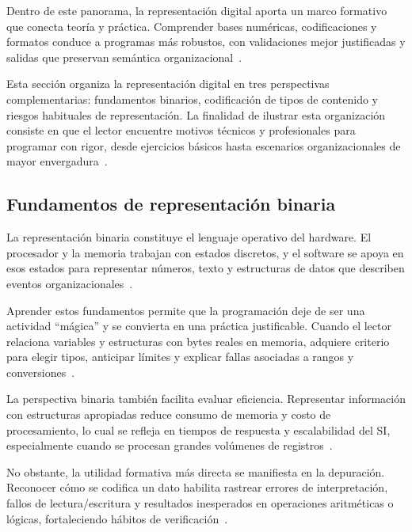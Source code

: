 \documentclass[12pt,twoside]{book}
\begin{document}
				Dentro de este panorama, la representación digital aporta un marco formativo que conecta teoría y práctica. Comprender bases numéricas, codificaciones y formatos conduce a programas más robustos, con validaciones mejor justificadas y salidas que preservan semántica organizacional~\cite{Hanly2015Problem,Wirth1976Algorithms,Ghezzi2003Fundamentals}.
				
				Esta sección organiza la representación digital en tres perspectivas complementarias: fundamentos binarios, codificación de tipos de contenido y riesgos habituales de representación. La finalidad de ilustrar esta organización consiste en que el lector encuentre motivos técnicos y profesionales para programar con rigor, desde ejercicios básicos hasta escenarios organizacionales de mayor envergadura~\cite{Tegarden2025Systems,Laudon2020Management,Sommerville2015Software}.
				
				\subsection{Fundamentos de representación binaria}
						
					La representación binaria constituye el lenguaje operativo del hardware. El procesador y la memoria trabajan con estados discretos, y el software se apoya en esos estados para representar números, texto y estructuras de datos que describen eventos organizacionales~\cite{Tanenbaum2021Structured,Silberschatz2018Operating,Laudon2020Management}.
					
					Aprender estos fundamentos permite que la programación deje de ser una actividad “mágica” y se convierta en una práctica justificable. Cuando el lector relaciona variables y estructuras con bytes reales en memoria, adquiere criterio para elegir tipos, anticipar límites y explicar fallas asociadas a rangos y conversiones~\cite{Gaddis2022Starting,Hanly2015Problem,Sebesta2018Concepts}.
					
					La perspectiva binaria también facilita evaluar eficiencia. Representar información con estructuras apropiadas reduce consumo de memoria y costo de procesamiento, lo cual se refleja en tiempos de respuesta y escalabilidad del SI, especialmente cuando se procesan grandes volúmenes de registros~\cite{Wirth1976Algorithms,Sedgewick2011Algorithms,Tanenbaum2021Structured}.
					
					No obstante, la utilidad formativa más directa se manifiesta en la depuración. Reconocer cómo se codifica un dato habilita rastrear errores de interpretación, fallos de lectura/escritura y resultados inesperados en operaciones aritméticas o lógicas, fortaleciendo hábitos de verificación~\cite{Ghezzi2003Fundamentals,Pressman2019Software,Gaddis2022Starting}.
					
\end{document}
